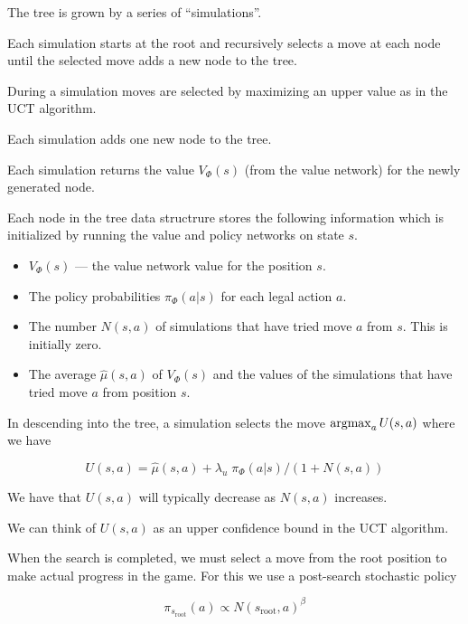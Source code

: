 {\vfill
The tree is grown by a series of ``simulations''.

\vfill
Each simulation starts at the root and recursively selects a move at each node until the selected move adds a new node to the tree.


During a simulation moves are selected by maximizing an upper value as in the UCT algorithm.

\vfill
Each simulation adds one new node to the tree.

\vfill
Each simulation returns the value $V_\Phi(s)$ (from the value network) for the newly generated node.


\vfill
Each node in the tree data structrure stores the following information which is initialized
by running the value and policy networks on state $s$.

\begin{itemize}
\item $V_\Phi(s)$ --- the value network value for the position $s$.
\item The policy probabilities $\pi_\Phi(a|s)$ for each legal action $a$.
\item The number $N(s,a)$ of simulations that have tried move $a$ from $s$. This is initially zero.
\item The average $\hat{\mu}(s,a)$ of $V_\Phi(s)$ and the values of the simulations that have
  tried move $a$ from position $s$.
\end{itemize}


In descending into the tree, a simulation selects the move $\operatorname*{argmax}_a U(s,a)$ where we have

\vfill
$$U(s,a) =   \hat{\mu}(s,a) + \lambda_u\; \pi_\Phi(a|s)/(1+N(s,a))$$

\vfill
We have that $U(s,a)$ will typically decrease as $N(s,a)$ increases.

\vfill
We can think of $U(s,a)$ as an upper confidence bound in the UCT algorithm.


When the search is completed, we must select a move from the root position to make actual progress in the game.  For this we use a post-search stochastic policy

\vfill
$$\pi_{s_{\mathrm{root}}}(a) \propto N(s_{\mathrm{root}},a)^\beta$$

}
